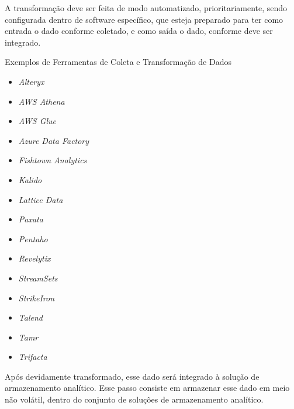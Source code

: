 A transformação deve ser feita de modo automatizado, prioritariamente, sendo configurada dentro de software específico, que esteja preparado para ter como entrada o dado conforme coletado, e como saída o dado, conforme deve ser integrado.

\begin{env-sistemas}{Exemplos de Ferramentas de Coleta e Transformação de Dados}
     \begin{multicols}{2}
        \begin{itemize}
            \item \emph{Alteryx}
            \item \emph{AWS Athena}
            \item \emph{AWS Glue}
            \item \emph{Azure Data Factory}
            \item \emph{Fishtown Analytics}
            \item \emph{Kalido}
            \item \emph{Lattice Data}
            \item \emph{Paxata}
            \item \emph{Pentaho}
            \item \emph{Revelytix}
            \item \emph{StreamSets}
            \item \emph{StrikeIron}
            \item \emph{Talend}
            \item \emph{Tamr}
            \item \emph{Trifacta}
        \end{itemize}
    \end{multicols}
\end{env-sistemas}

Após devidamente transformado, esse dado será integrado à solução de armazenamento analítico. Esse passo consiste em armazenar esse dado em meio não volátil, dentro do conjunto de soluções de armazenamento analítico.

